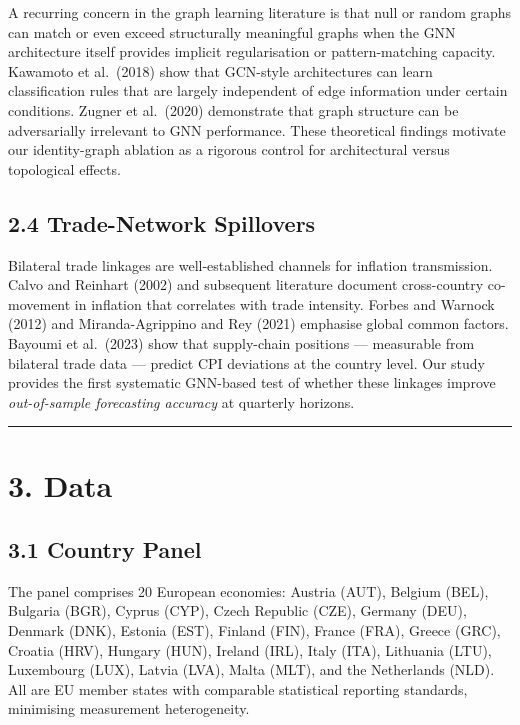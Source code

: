 \documentclass[
  11pt,
  a4paper]{article}
\begin{document}
A recurring concern in the graph learning literature is that null or
random graphs can match or even exceed structurally meaningful graphs
when the GNN architecture itself provides implicit regularisation or
pattern-matching capacity. Kawamoto et al.~(2018) show that GCN-style
architectures can learn classification rules that are largely
independent of edge information under certain conditions. Zugner et
al.~(2020) demonstrate that graph structure can be adversarially
irrelevant to GNN performance. These theoretical findings motivate our
identity-graph ablation as a rigorous control for architectural versus
topological effects.

\subsection{2.4 Trade-Network
Spillovers}\label{trade-network-spillovers}

Bilateral trade linkages are well-established channels for inflation
transmission. Calvo and Reinhart (2002) and subsequent literature
document cross-country co-movement in inflation that correlates with
trade intensity. Forbes and Warnock (2012) and Miranda-Agrippino and Rey
(2021) emphasise global common factors. Bayoumi et al.~(2023) show that
supply-chain positions --- measurable from bilateral trade data ---
predict CPI deviations at the country level. Our study provides the
first systematic GNN-based test of whether these linkages improve
\emph{out-of-sample forecasting accuracy} at quarterly horizons.

\begin{center}\rule{0.5\linewidth}{0.5pt}\end{center}

\section{3. Data}\label{data}

\subsection{3.1 Country Panel}\label{country-panel}

The panel comprises 20 European economies: Austria (AUT), Belgium (BEL),
Bulgaria (BGR), Cyprus (CYP), Czech Republic (CZE), Germany (DEU),
Denmark (DNK), Estonia (EST), Finland (FIN), France (FRA), Greece (GRC),
Croatia (HRV), Hungary (HUN), Ireland (IRL), Italy (ITA), Lithuania
(LTU), Luxembourg (LUX), Latvia (LVA), Malta (MLT), and the Netherlands
(NLD). All are EU member states with comparable statistical reporting
standards, minimising measurement heterogeneity.
\end{document}
